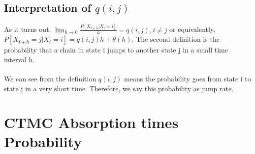 \documentclass[12pt]{article}
\begin{document}
\subsection{Interpretation of $q(i,j)$}

As it turns out, $\lim_{h  \to 0} \frac{P[X_{t+h}|X_t=i]}{h}=q(i,j), i\ne j$ or equivalently, $P[X_{t+h}=j|X_t=i]=q(i,j)h+\theta(h)$. The second definition is the probability that a chain in state i jumps to another state j in a small time interval h.
\\
\\We can see from the definition $q(i,j)$ means the probability goes from state i to state j in a very short time. Therefore, we say this probability as jump rate.

\section{CTMC Absorption times Probability}
\end{document}
